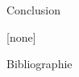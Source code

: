 \documentclass[8pt]{beamer}
\begin{document}
\begin{frame}{Conclusion}
\end{frame}

[none]


\begin{frame}{Bibliographie}
    \nocite{*}
    
\end{frame}
\addtocounter{framenumber}{-1}
\end{document}
